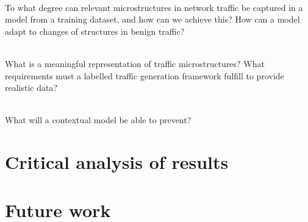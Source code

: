 \begin{rquestion}\ \\
To what degree can relevant microstructures in network traffic be captured in a model from a training dataset, and how can we achieve this? How can a model adapt to changes of structures in benign traffic?
\end{rquestion}

\begin{rquestion}\ \\
What is a meaningful representation of traffic microstructures? What requirements must a labelled traffic generation framework fulfill to provide realistic data?
\end{rquestion}


\begin{rquestion}\ \\
What will a contextual model be able to prevent? 
\end{rquestion}

\section{Critical analysis of results}

\section{Future work}

